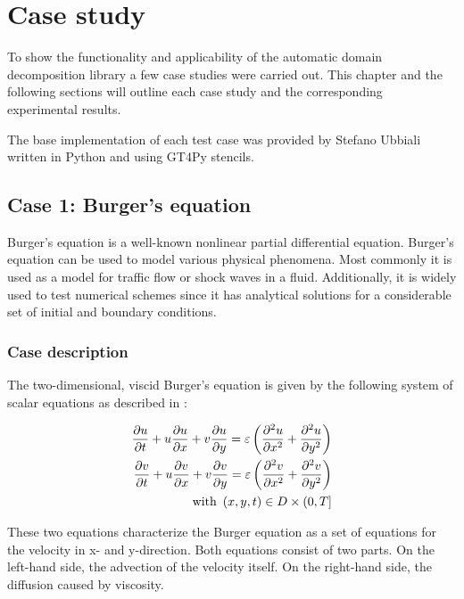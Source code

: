 \section{Case study}

To show the functionality and applicability of the automatic domain decomposition library a few case studies were carried out.
This chapter and the following sections will outline each case study and the corresponding experimental results.

The base implementation of each test case was provided by Stefano Ubbiali written in Python and using GT4Py stencils.

\subsection{Case 1: Burger's equation}
Burger's equation is a well-known nonlinear partial differential equation.
Burger's equation can be used to model various physical phenomena.
Most commonly it is used as a model for traffic flow or shock waves in a fluid.
Additionally, it is widely used to test numerical schemes since it has analytical solutions for a considerable set of initial and boundary conditions.

\subsubsection{Case description}
\label{sec:case_description}

The two-dimensional, viscid Burger's equation is given by the following system of scalar equations as described in \citet{zhao2011new}:

\begin{equation}
\begin{split}
\frac{\partial u}{\partial t} + u \frac{\partial u}{\partial x} + v \frac{\partial u}{\partial y} = \varepsilon \left( \frac{\partial ^2 u}{\partial x^2} + \frac{\partial ^2 u}{\partial y^2} \right) \\
\frac{\partial v}{\partial t} + u \frac{\partial v}{\partial x} + v \frac{\partial v}{\partial y} = \varepsilon \left( \frac{\partial ^2 v}{\partial x^2} + \frac{\partial ^2 v}{\partial y^2} \right) \\
\text{with } \left(x, y, t\right) \in D \times \left(0,T\right]
\end{split}
\end{equation}

These two equations characterize the Burger equation as a set of equations for the velocity in x- and y-direction.
Both equations consist of two parts.
On the left-hand side, the advection of the velocity itself.
On the right-hand side, the diffusion caused by viscosity.

